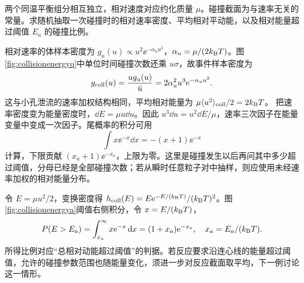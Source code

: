 \begin{example}[按碰撞事件抽样的相对能量]
两个同温平衡组分相互独立，相对速度对应约化质量 $\mu$。碰撞截面为与速率无关的常量。求随机抽取一次碰撞时的相对速率密度、平均相对平动能，以及相对能量超过阈值 $E_a$ 的碰撞比例。
\end{example}
\begin{solution}
相对速率的体样本密度为 $g_u(u)\propto u^2\ee^{-\alpha_u u^2}$，$\alpha_u=\mu/(2k_{\mathrm B} T)$。图\ref{fig:collisionenergyq}中单位时间碰撞次数还乘 $u\sigma$，故事件样本密度为
\[
 g_{\rm coll}(u)=\frac{ug_u(u)}{\bar u}=2\alpha_u^2u^3\mathrm e^{-\alpha_uu^2}.
\]
这与小孔泄流的速率加权结构相同，平均相对能量为 $\mu\langle u^2\rangle_{\rm coll}/2=2k_{\mathrm B} T$。
把速率密度变为能量密度时，$\dd E=\mu u\dd u$。因此 $u^3\dd u=u^2\dd E/\mu$，速率三次因子在能量变量中变成一次因子。尾概率的积分可用
\[
 \int x\ee^{-x}\dd x=-(x+1)\ee^{-x}
\]
计算，下限贡献 $(x_a+1)\ee^{-x_a}$，上限为零。这里是碰撞发生以后再问其中多少超过阈值，分母已经是全部碰撞次数；若从瞬时任意粒子对中抽样，则应使用未经速率加权的相对能量分布。

令 $E=\mu u^2/2$，变换密度得 $h_{\rm coll}(E)=E\mathrm e^{-E/(k_{\mathrm B} T)}/(k_{\mathrm B} T)^2$。图\ref{fig:collisionenergya}阈值右侧积分，令 $x=E/(k_{\mathrm B} T)$，
\[
 P(E>E_a)=\int_{x_a}^\infty x\mathrm e^{-x}\mathop{}\!\mathrm d x=(1+x_a)\mathrm e^{-x_a},\quad x_a=E_a/(k_{\mathrm B} T).
\]
所得比例对应“总相对动能超过阈值”的判据。若反应要求沿连心线的能量超过阈值，允许的碰撞参数范围也随能量变化，须进一步对反应截面取平均，下一例讨论这一情形。
\end{solution}

